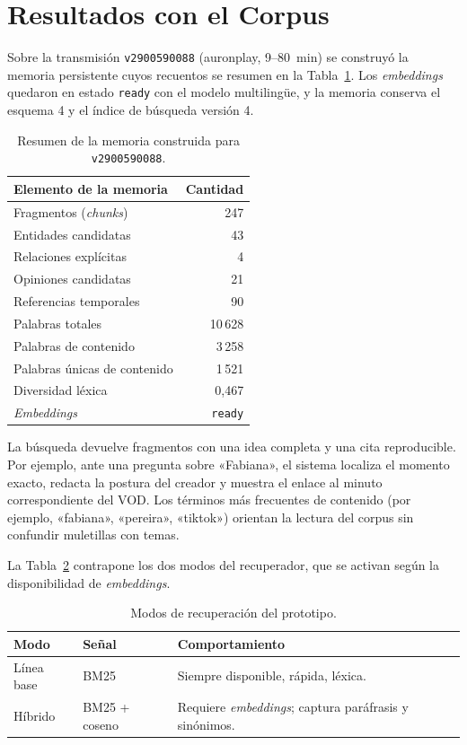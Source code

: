 \documentclass[12pt,a4paper]{article}
\begin{document}
\section{Resultados con el Corpus}
\label{sec:resultados}

Sobre la transmisión \texttt{v2900590088} (auronplay, 9--80~min) se construyó la memoria persistente cuyos recuentos se resumen en la Tabla~\ref{tab:memoria}. Los \emph{embeddings} quedaron en estado \texttt{ready} con el modelo multilingüe, y la memoria conserva el esquema 4 y el índice de búsqueda versión 4.

\begin{table}[h]
\centering
\small
\begin{tabular}{@{}lr@{}}
\toprule
\textbf{Elemento de la memoria} & \textbf{Cantidad} \\
\midrule
Fragmentos (\emph{chunks}) & 247 \\
Entidades candidatas & 43 \\
Relaciones explícitas & 4 \\
Opiniones candidatas & 21 \\
Referencias temporales & 90 \\
Palabras totales & 10\,628 \\
Palabras de contenido & 3\,258 \\
Palabras únicas de contenido & 1\,521 \\
Diversidad léxica & 0{,}467 \\
\emph{Embeddings} & \texttt{ready} \\
\bottomrule
\end{tabular}
\caption{Resumen de la memoria construida para \texttt{v2900590088}.}
\label{tab:memoria}
\end{table}

La búsqueda devuelve fragmentos con una idea completa y una cita reproducible. Por ejemplo, ante una pregunta sobre «Fabiana», el sistema localiza el momento exacto, redacta la postura del creador y muestra el enlace al minuto correspondiente del VOD. Los términos más frecuentes de contenido (por ejemplo, «fabiana», «pereira», «tiktok») orientan la lectura del corpus sin confundir muletillas con temas.

La Tabla~\ref{tab:compara} contrapone los dos modos del recuperador, que se activan según la disponibilidad de \emph{embeddings}.

\begin{table}[h]
\centering
\small
\begin{tabular}{@{}lll@{}}
\toprule
\textbf{Modo} & \textbf{Señal} & \textbf{Comportamiento} \\
\midrule
Línea base & BM25 & Siempre disponible, rápida, léxica. \\
Híbrido    & BM25 + coseno & Requiere \emph{embeddings}; captura paráfrasis y sinónimos. \\
\bottomrule
\end{tabular}
\caption{Modos de recuperación del prototipo.}
\label{tab:compara}
\end{table}
\end{document}
